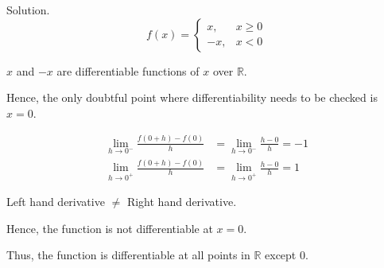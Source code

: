 Solution. 
\[
f(x) = 
\begin{cases} 
 x, & x \geq 0 \\ 
 -x, & x < 0 
\end{cases}
\]

\(x\) and \(-x\) are differentiable functions of \(x\) over \(\mathbb{R}\).

Hence, the only doubtful point where differentiability needs to be checked is \( x = 0 \).

\begin{align*}
\lim_{h \to 0^{-}} \frac{f(0 + h) - f(0)}{h} & = \lim_{h \to 0^{-}} \frac{h - 0}{h} = -1 \\[8pt]
\lim_{h \to 0^{+}} \frac{f(0 + h) - f(0)}{h} & = \lim_{h \to 0^{+}} \frac{h - 0}{h} = 1
\end{align*}

Left hand derivative \(\neq\) Right hand derivative.

Hence, the function is not differentiable at \( x = 0 \).

Thus, the function is differentiable at all points in \( \mathbb{R} \) except 0.


